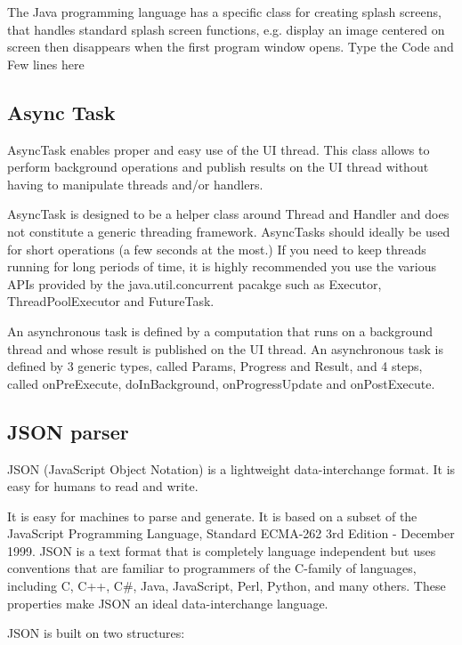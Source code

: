 The Java programming language has a specific class for creating splash screens,  that handles standard splash screen functions, e.g. display an image centered on screen then disappears when the first program window opens.
Type the Code and Few lines here



\subsection{Async Task }

AsyncTask enables proper and easy use of the UI thread. This class allows to perform background operations and publish results on the UI thread without having to manipulate threads and/or handlers.

AsyncTask is designed to be a helper class around Thread and Handler and does not constitute a generic threading framework. AsyncTasks should ideally be used for short operations (a few seconds at the most.) If you need to keep threads running for long periods of time, it is highly recommended you use the various APIs provided by the java.util.concurrent pacakge such as Executor, ThreadPoolExecutor and FutureTask.

An asynchronous task is defined by a computation that runs on a background thread and whose result is published on the UI thread. An asynchronous task is defined by 3 generic types, called Params, Progress and Result, and 4 steps, called onPreExecute, doInBackground, onProgressUpdate and onPostExecute.



\subsection{JSON parser}

JSON (JavaScript Object Notation) is a lightweight data-interchange format. It is easy for humans to read and write.

 It is easy for machines to parse and generate. It is based on a subset of the JavaScript Programming Language, Standard ECMA-262 3rd Edition - December 1999. JSON is a text format that is completely language independent but uses conventions that are familiar to programmers of the C-family of languages, including C, C++, C#, Java, JavaScript, Perl, Python, and many others. These properties make JSON an ideal data-interchange language.

JSON is built on two structures:

